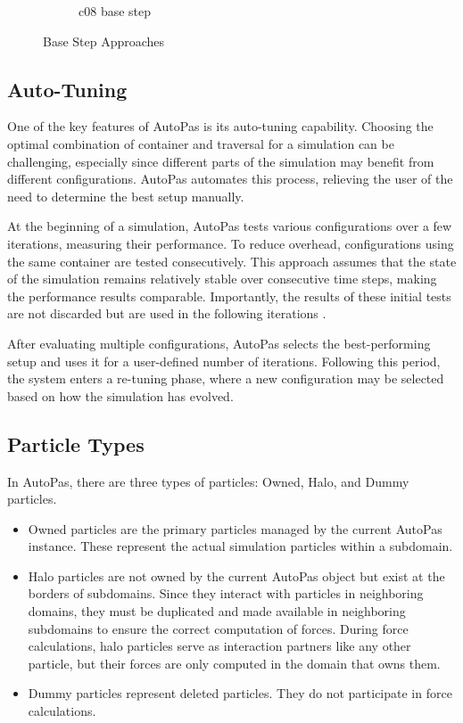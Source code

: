 \begin{figure}[htbp]
\begin{subfigure}[b]{0.25\textwidth}
        \caption{\scriptsize c08 base step}
        \label{fig:c08}
    \end{subfigure}
    \caption{Base Step Approaches \parencite{newcome2023towards}}
\end{figure}



\subsection{Auto-Tuning}

One of the key features of AutoPas is its auto-tuning capability. Choosing the optimal combination of container and traversal for a simulation can be challenging, especially since different parts of the simulation may benefit from different configurations. AutoPas automates this process, relieving the user of the need to determine the best setup manually.

At the beginning of a simulation, AutoPas tests various configurations over a few iterations, measuring their performance. To reduce overhead, configurations using the same container are tested consecutively. This approach assumes that the state of the simulation remains relatively stable over consecutive time steps, making the performance results comparable. Importantly, the results of these initial tests are not discarded but are used in the following iterations \parencite{gratl2019autopas}.

After evaluating multiple configurations, AutoPas selects the best-performing setup and uses it for a user-defined number of iterations. Following this period, the system enters a re-tuning phase, where a new configuration may be selected based on how the simulation has evolved.








\subsection{Particle Types}

In AutoPas, there are three types of particles: Owned, Halo, and Dummy particles.  
\begin{itemize}
    \item Owned particles are the primary particles managed by the current AutoPas instance. These represent the actual simulation particles within a subdomain.  
    \item Halo particles are not owned by the current AutoPas object but exist at the borders of subdomains. Since they interact with particles in neighboring domains, they must be duplicated and made available in neighboring subdomains to ensure the correct computation of forces. During force calculations, halo particles serve as interaction partners like any other particle, but their forces are only computed in the domain that owns them.  
    \item Dummy particles represent deleted particles. They do not participate in force calculations.

\end{itemize}


